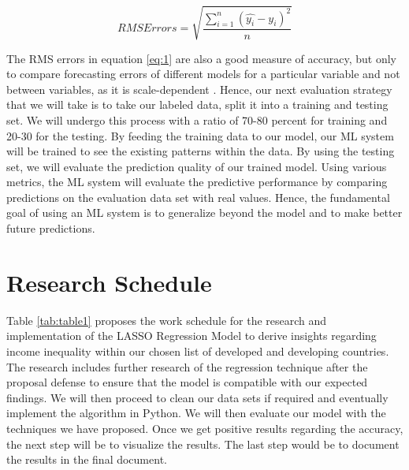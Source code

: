\documentclass[12pt,oneside]{book} %
\begin{document}
\begin{equation} \label{eq:1}
      RMS Errors = \sqrt{\frac{\sum_{i=1}^{n}(\hat{y_{i}}- y_{i})^2}{n}}
\end{equation}


The RMS errors in equation \ref{eq:1} are also a good measure of accuracy, but only to compare forecasting errors of different models for a particular variable and not between variables, as it is scale-dependent \cite{neill2018chapter}. Hence, our next evaluation strategy that we will take is to take our labeled data, split it into a training and testing set. We will undergo this process with a ratio of 70-80 percent for training and 20-30 for the testing. By feeding the training data to our model, our ML system will be trained to see the existing patterns within the data. By using the testing set, we will evaluate the prediction quality of our trained model. Using various metrics, the ML system will evaluate the predictive performance by comparing predictions on the evaluation data set with real values. Hence, the fundamental goal of using an ML system is to generalize beyond the model and to make better future predictions.

\section{Research Schedule}
\label{sec:plan}

\hspace{20pt}Table \ref{tab:table1} proposes the work schedule for the research and implementation of the LASSO Regression Model to derive insights regarding income inequality within our chosen list of developed and developing countries. The research includes further research of the regression technique after the proposal defense to ensure that the model is compatible with our expected findings. We will then proceed to clean our data sets if required and eventually implement the algorithm in Python. We will then evaluate our model with the techniques we have proposed. Once we get positive results regarding the accuracy, the next step will be to visualize the results. The last step would be to document the results in the final document. 
\end{document}

